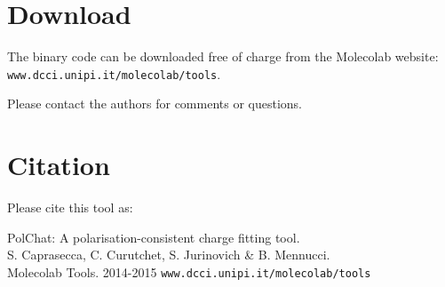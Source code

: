 \documentclass[a4paper]{report}
\begin{document}
\section*{Download}

The binary code can be downloaded free of charge from the Molecolab website:
\texttt{www.dcci.unipi.it/molecolab/tools}.

Please contact the authors for comments or questions.

\section*{Citation}

Please cite this tool as: 

\indent PolChat: A polarisation-consistent charge fitting tool. \\
\indent S. Caprasecca, C. Curutchet, S. Jurinovich \& B. Mennucci. \\
\indent Molecolab Tools. 2014-2015 \texttt{www.dcci.unipi.it/molecolab/tools}
\end{document}

